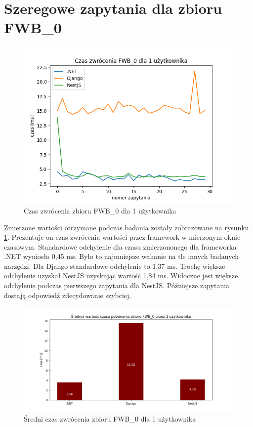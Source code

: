 \section{Szeregowe zapytania dla zbioru FWB\_0}

\begin{figure}[!hb]
	\centering \includegraphics[width=1\linewidth]{rysunki/Czas_zwrocenia_FWB_0_dla_1_uzytkownika.png}
	\caption{Czas zwrócenia zbioru FWB\_0 dla 1 użytkownika}
	\label{rys:request_duration_for_FWB_0}
\end{figure}

Zmierzone wartości otrzymane podczas badania zostały zobrazowane na rysunku \ref{rys:request_duration_for_FWB_0}.
Prezentuje on czas zwrócenia wartości przez framework w mierzonym oknie czasowym.
Standardowe odchylenie dla czasu zmierzononego dla frameworka .NET wyniosło 0,45 ms.
Było to najmniejsze wahanie na tle innych badanych narzędzi.
Dla Django standardowe odchylenie to 1,37 ms.
Trochę większe odchylenie uzyskał NestJS uzyskując wartość 1,84 ms.
Widoczne jest większe odchylenie podczas pierwszego zapytania dla NestJS.
Późniejsze zapytania dostają odpowiedź zdecydowanie szybciej.

\begin{figure}[!hb]
	\centering \includegraphics[width=1\linewidth]{rysunki/Srednia_wartosc_czasu_pobierania_zbioru_FWB_0_przez_1_uzytkownika.png}
	\caption{Średni czas zwrócenia zbioru FWB\_0 dla 1 użytkownika}
	\label{rys:mean_duration_for_FWB_0}
\end{figure}

